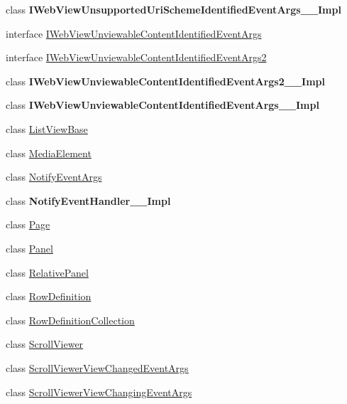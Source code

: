 \begin{DoxyCompactItemize}
\item 
class {\bfseries I\+Web\+View\+Unsupported\+Uri\+Scheme\+Identified\+Event\+Args\+\_\+\+\_\+\+Impl}
\item 
interface \hyperlink{interface_windows_1_1_u_i_1_1_xaml_1_1_controls_1_1_i_web_view_unviewable_content_identified_event_args}{I\+Web\+View\+Unviewable\+Content\+Identified\+Event\+Args}
\item 
interface \hyperlink{interface_windows_1_1_u_i_1_1_xaml_1_1_controls_1_1_i_web_view_unviewable_content_identified_event_args2}{I\+Web\+View\+Unviewable\+Content\+Identified\+Event\+Args2}
\item 
class {\bfseries I\+Web\+View\+Unviewable\+Content\+Identified\+Event\+Args2\+\_\+\+\_\+\+Impl}
\item 
class {\bfseries I\+Web\+View\+Unviewable\+Content\+Identified\+Event\+Args\+\_\+\+\_\+\+Impl}
\item 
class \hyperlink{class_windows_1_1_u_i_1_1_xaml_1_1_controls_1_1_list_view_base}{List\+View\+Base}
\item 
class \hyperlink{class_windows_1_1_u_i_1_1_xaml_1_1_controls_1_1_media_element}{Media\+Element}
\item 
class \hyperlink{class_windows_1_1_u_i_1_1_xaml_1_1_controls_1_1_notify_event_args}{Notify\+Event\+Args}
\item 
class {\bfseries Notify\+Event\+Handler\+\_\+\+\_\+\+Impl}
\item 
class \hyperlink{class_windows_1_1_u_i_1_1_xaml_1_1_controls_1_1_page}{Page}
\item 
class \hyperlink{class_windows_1_1_u_i_1_1_xaml_1_1_controls_1_1_panel}{Panel}
\item 
class \hyperlink{class_windows_1_1_u_i_1_1_xaml_1_1_controls_1_1_relative_panel}{Relative\+Panel}
\item 
class \hyperlink{class_windows_1_1_u_i_1_1_xaml_1_1_controls_1_1_row_definition}{Row\+Definition}
\item 
class \hyperlink{class_windows_1_1_u_i_1_1_xaml_1_1_controls_1_1_row_definition_collection}{Row\+Definition\+Collection}
\item 
class \hyperlink{class_windows_1_1_u_i_1_1_xaml_1_1_controls_1_1_scroll_viewer}{Scroll\+Viewer}
\item 
class \hyperlink{class_windows_1_1_u_i_1_1_xaml_1_1_controls_1_1_scroll_viewer_view_changed_event_args}{Scroll\+Viewer\+View\+Changed\+Event\+Args}
\item 
class \hyperlink{class_windows_1_1_u_i_1_1_xaml_1_1_controls_1_1_scroll_viewer_view_changing_event_args}{Scroll\+Viewer\+View\+Changing\+Event\+Args}

\end{DoxyCompactItemize}
